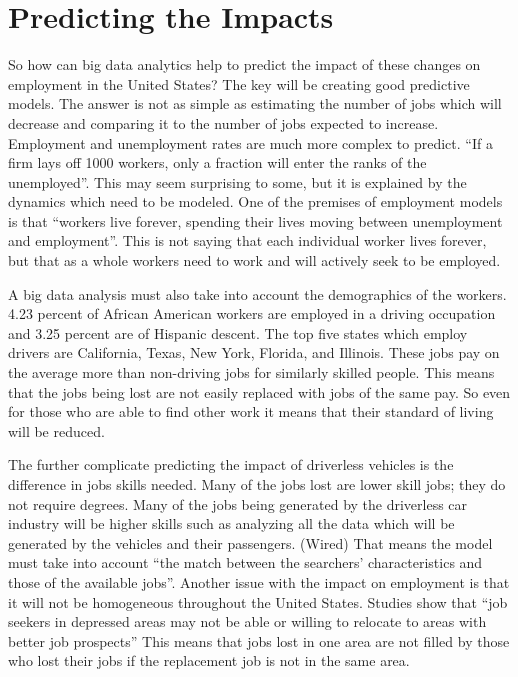 \documentclass[sigconf]{acmart}
\begin{document}
\section{Predicting the Impacts}

So how can big data analytics help to predict the impact of these changes on 
employment in the United States?  The key will be creating good predictive 
models.  The answer is not as simple as estimating the number of jobs which 
will decrease and comparing it to the number of jobs expected to increase.  
Employment and unemployment rates are much more complex to predict.  ``If a 
firm lays off 1000 workers, only a fraction will enter the ranks of the 
unemployed''.\cite{MacroTheory}  This may seem surprising to some, but it is 
explained by the dynamics which need to be modeled.  One of the premises 
of employment models is that ``workers live forever, spending their lives 
moving between unemployment and employment''.\cite{QuantitativeEconomics}  This 
is not saying that each individual worker lives forever, but that as a whole 
workers need to work and will actively seek to be employed.  

A big data analysis must also take into account the demographics of the 
workers.  4.23 percent of African American workers are employed in a driving 
occupation and 3.25 percent are of Hispanic descent.  The top five states 
which employ drivers are California, Texas, New York, Florida, and Illinois.  
These jobs pay on the average more than non-driving jobs for similarly 
skilled people.\cite{InsuranceJournal}  This means that the jobs being lost are 
not easily replaced with jobs of the same pay.  So even for those who are 
able to find other work it means that their standard of living will be 
reduced.  

The further complicate predicting the impact of driverless vehicles is the 
difference in jobs skills needed.  Many of the jobs lost are lower skill jobs; 
they do not require degrees.  Many of the jobs being generated by the 
driverless car industry will be higher skills such as analyzing all the data 
which will be generated by the vehicles and their passengers.  (Wired)  That 
means the model must take into account ``the match between the searchers' 
characteristics and those of the available jobs''.\cite{MacroTheory}  Another 
issue with the impact on employment is that it will not be homogeneous 
throughout the United States.  Studies show that ``job seekers in depressed 
areas may not be able or willing to relocate to areas with better job 
prospects''\cite{NBERw22672}  This means that jobs lost in one area are not 
filled by those who lost their jobs if the replacement job is not in the 
same area.  
\end{document}
